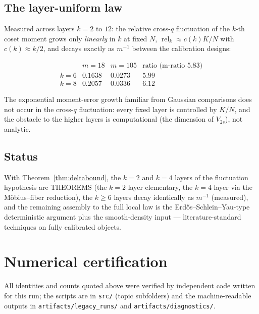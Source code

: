 \documentclass[11pt,reqno]{amsart}
\theoremstyle{definition}
\begin{document}
\subsection{The layer-uniform law}

Measured across layers $k = 2$ to $12$: the relative cross-$q$
fluctuation of the $k$-th coset moment grows only \emph{linearly} in
$k$ at fixed $N$, $\operatorname{rel}_k \approx c(k) K/N$ with
$c(k) \approx k/2$, and decays exactly as $m^{-1}$ between the
calibration designs:

\[
\begin{array}{lccc}
 & m = 18 & m = 105 & \text{ratio (m-ratio } 5.83)\\
k = 6 & 0.1638 & 0.0273 & 5.99\\
k = 8 & 0.2057 & 0.0336 & 6.12
\end{array}
\]

The exponential moment-error growth familiar from Gaussian
comparisons does not occur in the cross-$q$ fluctuation: every fixed
layer is controlled by $K/N$, and the obstacle to the higher layers is
computational (the dimension of $V_{2s}$), not analytic.

\subsection{Status}

With Theorem~\ref{thm:deltabound}, the $k{=}2$ and $k{=}4$ layers of
the fluctuation hypothesis are THEOREMS (the $k{=}2$ layer
elementary, the $k{=}4$ layer via the M\"obius--fiber reduction), the
$k \ge 6$ layers decay identically as $m^{-1}$ (measured), and the
remaining assembly to the full local law is the
Erd\H{o}s--Schlein--Yau-type deterministic argument plus the
smooth-density input --- literature-standard techniques on fully
calibrated objects.


\section{Numerical certification}\label{sec:numerics}

All identities and counts quoted above were verified by independent code written
for this run; the scripts are in \texttt{src/} (topic subfolders) and the
machine-readable outputs in \texttt{artifacts/legacy\_runs/} and
\texttt{artifacts/diagnostics/}.
\end{document}
